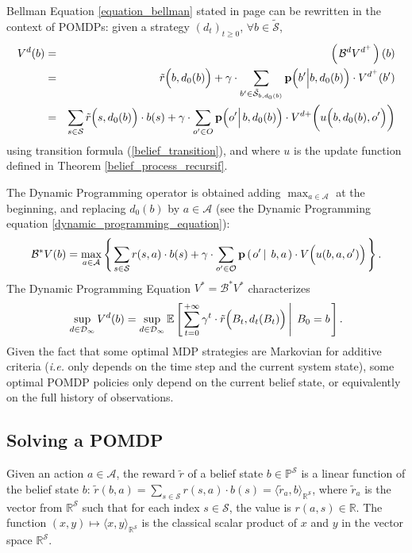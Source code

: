 Bellman Equation \ref{equation_bellman} stated in page \pageref{equation_bellman} 
can be rewritten in the context of POMDPs:
given a strategy $(d_t)_{t \geqslant 0}$, $\forall b \in \tilde{\mathcal{S}}$,
\begin{eqnarray*}
V^d(b) & = & \left( \left. \mathcal{B}^d V^{d^+} \right. \right)(b) \\
& = & \tilde{r} \Big( b,d_0(b) \Big) + \gamma \cdot \sum_{b' \in \tilde{\mathcal{S}}_{b,d_0(b)} } \textbf{p} \Big( b' \Big\vert b,d_{0}(b) \Big) \cdot V^{d^+}(b') \\
& = & \sum_{s \in \mathcal{S}} \tilde{r} \Big( s,d_0(b) \Big) \cdot b(s)  + \gamma \cdot \sum_{o' \in O}  \textbf{p} \Big( o' \Big\vert \hspace{0.05cm} b, d_0(b) \Big) \cdot V^{d+} \bigg( u \Big(b, d_0(b), o' \Big) \bigg) 
\end{eqnarray*} 
using transition formula (\ref{belief_transition}), and where $u$ is the update function defined in Theorem \ref{belief_process_recursif}.

The Dynamic Programming operator
is obtained adding $\max_{a \in \mathcal{A}}$ at the beginning, 
and replacing $d_0(b)$ by $a \in \mathcal{A}$ 
(see the Dynamic Programming equation \ref{dynamic_programming_equation}):
\begin{equation}
\label{equation_bellmanOperator_POMDP}
 \mathcal{B}^* V(b) = \max_{a \in \mathcal{A}} \left\{ \left.  \sum_{s \in \mathcal{S}} r(s,a) \cdot b(s) + \gamma \cdot \sum_{o' \in \mathcal{O}} \textbf{p} \left( \left. o' \, \right| \left. \, b , a  \right. \right) \cdot V \Big( u(b,a,o')  \Big)  \right. \right\}. 
\end{equation}
The Dynamic Programming Equation $V^* = \mathcal{B}^* V^*$ characterizes 
\[ \sup_{d \in \mathcal{D}_{\infty}} V^{d}(b) = \sup_{d \in \mathcal{D}_{\infty}} \mathbb{E} \left[ \left.  \sum_{t=0}^{+ \infty} \gamma^t \cdot \tilde{r}\Big(B_t,d_t(B_t)\Big) \, \right| \left. \, B_0=b   \right. \right]. \]
Given the fact that some optimal MDP strategies
are Markovian for additive criteria
(\textit{i.e.} only depends on the time step 
and the current system state),
some optimal POMDP policies 
only depend on the current belief state,
or equivalently on the full history of observations.

\subsection{Solving a POMDP}
Given an action $a \in \mathcal{A}$, 
the reward $\tilde{r}$ of a belief state $b \in \mathbb{P}^{\mathcal{S}}$ 
is a linear function of the belief state $b$: $\tilde{r}(b,a) = \sum_{s \in \mathcal{S}} r(s,a) \cdot b(s) = \langle \tilde{r}_a, b \rangle_{\mathbb{R}^{\mathcal{S}}}$,
where $\tilde{r}_a$ is the vector from $\mathbb{R}^{\mathcal{S}}$ 
such that for each index $s \in \mathcal{S}$, the value is $r(a,s) \in \mathbb{R}$. 
The function $(x,y) \mapsto \langle x , y \rangle_{\mathbb{R}^{\mathcal{S}}}$
is the classical scalar product of $x$ and $y$ in the vector space $\mathbb{R}^{\mathcal{S}}$.

